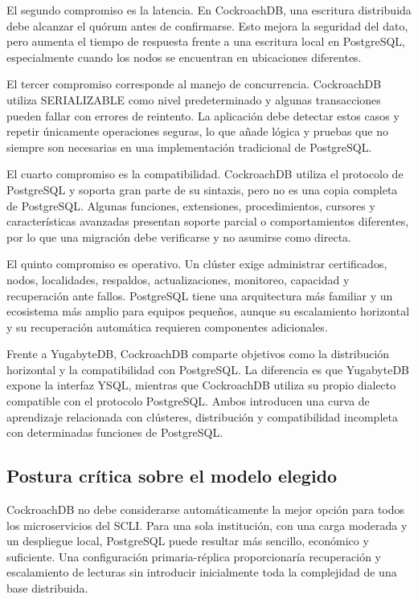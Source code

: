 \documentclass[conference]{IEEEtran}
\begin{document}
El segundo compromiso es la latencia. En CockroachDB, una escritura distribuida debe alcanzar el quórum antes de confirmarse. Esto mejora la seguridad del dato, pero aumenta el tiempo de respuesta frente a una escritura local en PostgreSQL, especialmente cuando los nodos se encuentran en ubicaciones diferentes.

El tercer compromiso corresponde al manejo de concurrencia. CockroachDB utiliza SERIALIZABLE como nivel predeterminado y algunas transacciones pueden fallar con errores de reintento. La aplicación debe detectar estos casos y repetir únicamente operaciones seguras, lo que añade lógica y pruebas que no siempre son necesarias en una implementación tradicional de PostgreSQL.

El cuarto compromiso es la compatibilidad. CockroachDB utiliza el protocolo de PostgreSQL y soporta gran parte de su sintaxis, pero no es una copia completa de PostgreSQL. Algunas funciones, extensiones, procedimientos, cursores y características avanzadas presentan soporte parcial o comportamientos diferentes, por lo que una migración debe verificarse y no asumirse como directa.

El quinto compromiso es operativo. Un clúster exige administrar certificados, nodos, localidades, respaldos, actualizaciones, monitoreo, capacidad y recuperación ante fallos. PostgreSQL tiene una arquitectura más familiar y un ecosistema más amplio para equipos pequeños, aunque su escalamiento horizontal y su recuperación automática requieren componentes adicionales.

Frente a YugabyteDB, CockroachDB comparte objetivos como la distribución horizontal y la compatibilidad con PostgreSQL. La diferencia es que YugabyteDB expone la interfaz YSQL, mientras que CockroachDB utiliza su propio dialecto compatible con el protocolo PostgreSQL. Ambos introducen una curva de aprendizaje relacionada con clústeres, distribución y compatibilidad incompleta con determinadas funciones de PostgreSQL.

\subsection{Postura crítica sobre el modelo elegido}
CockroachDB no debe considerarse automáticamente la mejor opción para todos los microservicios del SCLI. Para una sola institución, con una carga moderada y un despliegue local, PostgreSQL puede resultar más sencillo, económico y suficiente. Una configuración primaria-réplica proporcionaría recuperación y escalamiento de lecturas sin introducir inicialmente toda la complejidad de una base distribuida.
\end{document}
